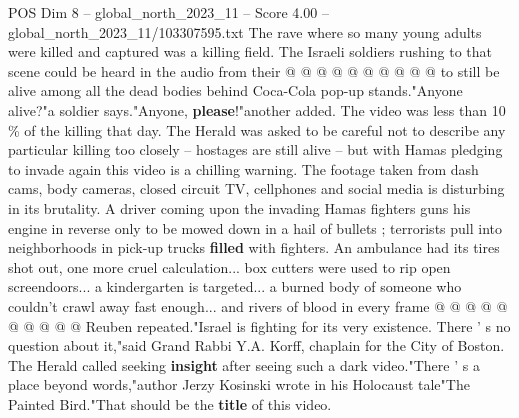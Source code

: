 \begin{textsample}{POS Dim 8 – global\_north\_2023\_11 – Score 4.00 – global\_north\_2023\_11/103307595.txt}
The rave where so many young adults were killed and captured was a killing field.
The Israeli soldiers rushing to that scene could be heard in the audio from their @ @ @ @ @ @ @ @ @ @ to still be alive among all the dead bodies behind Coca-Cola pop-up stands."Anyone alive?"a soldier says."Anyone, \textbf{please}!"another added.
The video was less than 10 \% of the killing that day.
The Herald was asked to be careful not to describe any particular killing too closely -- hostages are still alive -- but with Hamas pledging to invade again this video is a chilling warning.
The footage taken from dash cams, body cameras, closed circuit TV, cellphones and social media is disturbing in its brutality.
A driver coming upon the invading Hamas fighters guns his engine in reverse only to be mowed down in a hail of bullets ; terrorists pull into neighborhoods in pick-up trucks \textbf{filled} with fighters.
An ambulance had its tires shot out, one more cruel calculation... box cutters were used to rip open screendoors... a kindergarten is targeted... a burned body of someone who couldn't crawl away fast enough... and rivers of blood in every frame @ @ @ @ @ @ @ @ @ @ Reuben repeated."Israel is fighting for its very existence.
There ' s no question about it,"said Grand Rabbi Y.A.
Korff, chaplain for the City of Boston.
The Herald called seeking \textbf{insight} after seeing such a dark video."There ' s a place beyond words,"author Jerzy Kosinski wrote in his Holocaust tale"The Painted Bird."That should be the \textbf{title} of this video.

\end{textsample}
